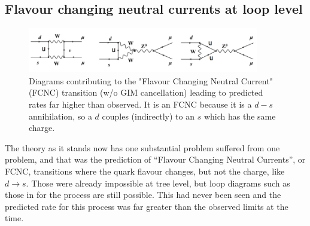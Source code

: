 \subsection{Flavour changing neutral currents at loop level}
\begin{figure}
\centering
\includegraphics[width=0.9\textwidth]{fig/0_K2mumu1}
\caption{Diagrams contributing to the "Flavour Changing Neutral Current" (FCNC) transition  (w/o GIM cancellation) leading to predicted rates far higher than observed. It is an FCNC because it is a $d-s$ annihilation, so a $d$ couples (indirectly) to an $s$ which has the same charge.
\label{fig:K2mumu1}}
\end{figure}
 The theory as it stands now has one substantial problem
 suffered from one problem, and that was the prediction of ``Flavour
 Changing Neutral Currents'', or FCNC, transitions where the quark
 flavour changes, but not the charge, like $d\to s$. Those were already impossible at tree level, but loop diagrams such as those in  for the process  are still possible. This had never been seen and the predicted rate for this process was far greater than the observed limits at the time.
 

